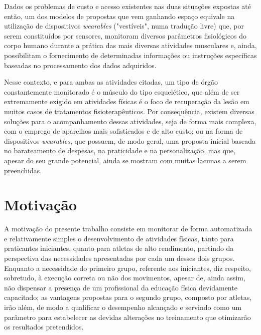     Dados os problemas de custo e acesso existentes nas duas situações expostas até então, um dos modelos de propostas que vem ganhando espaço equivale na utilização de dispositivos \textit{wearables} ("vestíveis", numa tradução livre) que, por serem constituídos por sensores, monitoram diversos parâmetros fisiológicos do corpo humano durante a prática das mais diversas atividades musculares e, ainda, possibilitam o fornecimento de determinadas informações ou instruções específicas baseadas no processamento dos dados adquiridos.
  
    Nesse contexto, e para ambas as atividades citadas, um tipo de órgão constantemente monitorado é o músculo do tipo esquelético, que além de ser extremamente exigido em atividades físicas é o foco de recuperação da lesão em muitos casos de tratamentos fisioterapêuticos. Por consequência, existem diversas soluções para o acompanhamento dessas atividades, seja de forma mais complexa, com o emprego de aparelhos mais sofisticados e de alto custo; ou na forma de dispositivos \textit{wearables}, que possuem, de modo geral, uma proposta inicial baseada no barateamento de despesas, na praticidade e na personalização, mas que, apesar do seu grande potencial, ainda se mostram com muitas lacunas a serem preenchidas. 

    
\section{Motivação}




    A motivação do presente trabalho consiste em monitorar de forma automatizada e relativamente simples o desenvolvimento de atividades físicas, tanto para praticantes iniciantes, quanto para atletas de alto rendimento, partindo da perspectiva das necessidades apresentadas por cada um desses dois grupos. Enquanto a necessidade do primeiro grupo, referente aos iniciantes, diz respeito, sobretudo, à execução correta ou não dos movimentos, apesar de, ainda assim, não dispensar a presença de um profissional da educação física devidamente capacitado; as vantagens propostas para o segundo grupo, composto por atletas, irão além, de modo a qualificar o desempenho alcançado e servindo como um parâmetro para estabelecer as devidas alterações no treinamento que otimizarão os resultados pretendidos. 
    
